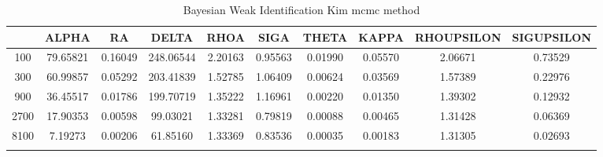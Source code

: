 \documentclass[a4paper,10pt]{article}
\begin{document}
\centering
\begin{longtable}{cccccccccc}
\toprule
 & ALPHA & RA & DELTA & RHOA & SIGA & THETA & KAPPA & RHOUPSILON & SIGUPSILON \\
\midrule
100 & 79.65821 & 0.16049 & 248.06544 & 2.20163 & 0.95563 & 0.01990 & 0.05570 & 2.06671 & 0.73529 \\
300 & 60.99857 & 0.05292 & 203.41839 & 1.52785 & 1.06409 & 0.00624 & 0.03569 & 1.57389 & 0.22976 \\
900 & 36.45517 & 0.01786 & 199.70719 & 1.35222 & 1.16961 & 0.00220 & 0.01350 & 1.39302 & 0.12932 \\
2700 & 17.90353 & 0.00598 & 99.03021 & 1.33281 & 0.79819 & 0.00088 & 0.00465 & 1.31428 & 0.06369 \\
8100 & 7.19273 & 0.00206 & 61.85160 & 1.33369 & 0.83536 & 0.00035 & 0.00183 & 1.31305 & 0.02693 \\
\bottomrule
\caption{Bayesian Weak Identification Kim mcmc method}
\label{table:tbl:WeakKim_mcmc}
\end{longtable}
\end{document}
